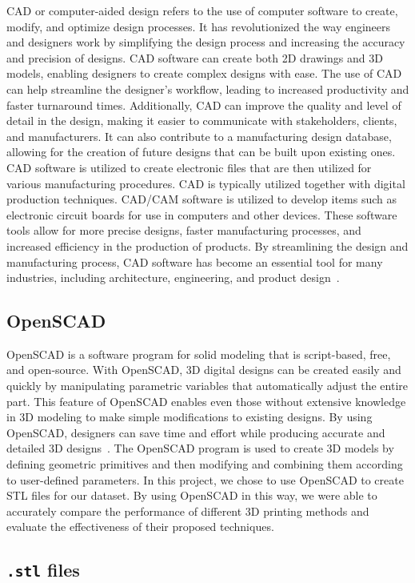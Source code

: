 \documentclass[sigconf,authorversion,nonacm]{acmart}
\begin{document}
CAD or computer-aided design refers to the use of computer software to create, modify, and optimize design processes. 
It has revolutionized the way engineers and designers work by simplifying the design process and increasing the accuracy and precision of designs. 
CAD software can create both 2D drawings and 3D models, enabling designers to create complex designs with ease. The use of CAD can help streamline the designer's workflow, leading to increased productivity and faster turnaround times. 
Additionally, CAD can improve the quality and level of detail in the design, making it easier to communicate with stakeholders, clients, and manufacturers. 
It can also contribute to a manufacturing design database, allowing for the creation of future designs that can be built upon existing ones. 
CAD software is utilized to create electronic files that are then utilized for various manufacturing procedures. 
CAD is typically utilized together with digital production techniques. CAD/CAM software is utilized to develop items such as electronic circuit boards for use in computers and other devices. 
These software tools allow for more precise designs, faster manufacturing processes, and increased efficiency in the production of products. 
By streamlining the design and manufacturing process, CAD software has become an essential tool for many industries, including architecture, engineering, and product design~\cite{chai_2020}. 

\subsection{OpenSCAD}
OpenSCAD is a software program for solid modeling that is script-based, free, and open-source. 
With OpenSCAD, 3D digital designs can be created easily and quickly by manipulating parametric variables that automatically adjust the entire part. 
This feature of OpenSCAD enables even those without extensive knowledge in 3D modeling to make simple modifications to existing designs. 
By using OpenSCAD, designers can save time and effort while producing accurate and detailed 3D designs~\cite{pearce2015applications}. 
The OpenSCAD program is used to create 3D models by defining geometric primitives and then modifying and combining them according to user-defined parameters. 
In this project, we chose to use OpenSCAD to create STL files for our dataset. By using OpenSCAD in this way, we were able to accurately compare the performance of different 3D printing methods and evaluate the effectiveness of their proposed techniques.
\subsection{\texttt{.stl} files}
\end{document}
